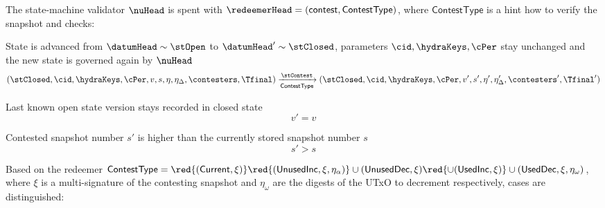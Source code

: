 \noindent The state-machine validator $\nuHead$ is spent with
$\redeemerHead = (\mathsf{contest}, \mathsf{ContestType})$, where
$\mathsf{ContestType}$ is a hint how to verify the snapshot and checks:
\begin{menumerate}
  \item State is advanced from $\datumHead \sim \stOpen$ to
  $\datumHead' \sim \stClosed$, parameters $\cid,\hydraKeys,\cPer$
  stay unchanged and the new state is governed again by $\nuHead$
  \[
	(\stClosed,\cid,\hydraKeys,\cPer,v,s,\eta,\eta_{\Delta},\contesters,\Tfinal) \xrightarrow[\mathsf{ContestType}]{\stContest} (\stClosed,\cid,\hydraKeys,\cPer,v',s',\eta',\eta_{\Delta}',\contesters',\Tfinal')
  \]

  \item Last known open state version stays recorded in closed state
  \[
	v' = v
  \]

  \item Contested snapshot number $s'$ is higher than the currently stored snapshot number $s$
  \[
	s' > s
  \]
  \item Based on the redeemer $\mathsf{ContestType} = \red{(\mathsf{Current}, \xi)} \red{(\mathsf{UnusedInc}, \xi, \eta_\alpha)} \cup (\mathsf{UnusedDec}, \xi) \red{\cup (\mathsf{UsedInc}, \xi)}  \cup (\mathsf{UsedDec}, \xi, \eta_\omega)$, where $\xi$ is a multi-signature of the contesting snapshot  and $\eta_\omega$ are the digests of the UTxO to  decrement respectively,  cases are distinguished:

  \begin{menumerate}
	\item {}
	\item {}


\end{menumerate}
\end{menumerate}
